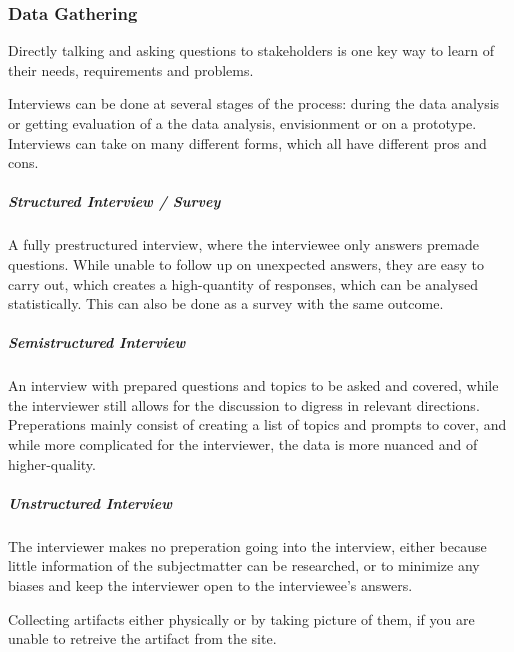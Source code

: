 \subsubsection{Data Gathering}
\label{sec:1_data_gathering}

\begin{method}[Interview] \label{meth:interview} 
  Directly talking and asking questions to stakeholders is one key way to learn
  of their needs, requirements and problems. 
  
  Interviews can be done at several stages of the process: during the data
  analysis or getting evaluation of a the data analysis, envisionment or on a
  prototype. Interviews can take on many different forms, which all have different pros and
  cons.
  \cite[p. 142-146]{benyon_14}
\end{method}

\subparagraph{Structured Interview / Survey}  
A fully prestructured interview, where the interviewee only answers premade
questions. While unable to follow up on unexpected answers, they are easy to
carry out, which creates a high-quantity of responses, which can be analysed
statistically. This can also be done as a survey with the same outcome. 
\cite[p. 142]{benyon_14}

\subparagraph{Semistructured Interview} 
An interview with prepared questions and topics to be asked and covered, while
the interviewer still allows for the discussion to digress in relevant
directions. Preperations mainly consist of creating a list of topics and prompts
to cover, and while more complicated for the interviewer, the data is more
nuanced and of higher-quality.
\cite[p. 143]{beynon_14}

\subparagraph{Unstructured Interview} 
The interviewer makes no preperation going into the interview, either because
little information of the subjectmatter can be researched, or to minimize any
biases and keep the interviewer open to the interviewee's answers.
\cite[p. 143]{benyon_14}

\begin{method}[Observation] \label{meth:observation} 
  
\end{method}

\begin{method} \label{meth:contextual_interview} 
  
\end{method}

\begin{definition}[Artifact] \label{def:artifact} 
  
\end{definition}

\begin{method} \label{meth:artifact_collection} 
  Collecting artifacts either physically or by taking picture of them, if you are unable to retreive the artifact from the site.
\end{method}